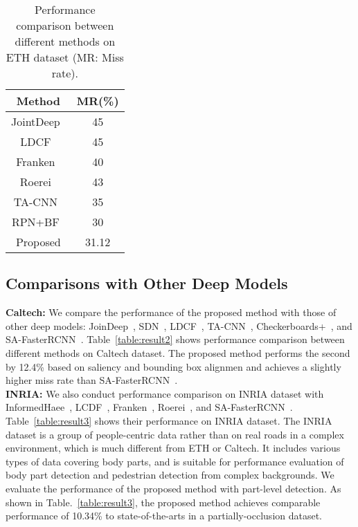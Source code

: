 \documentclass[journal]{IEEEtran}
\begin{document}
\begin{table}[t]
\caption{Performance comparison between different methods on ETH dataset (MR: Miss rate). }
\begin{center}
\begin{tabular}[c]{|c|c|}
\hline
\bf{Method} & MR(\%)  \\
\hline
JointDeep~\cite{ouyang2013joint} & 45 \\
\hline
LDCF~\cite{nam2014local} & 45 \\
\hline
Franken~\cite{mathias2013handling} & 40 \\
\hline
Roerei~\cite{benenson2013seeking} & 43 \\
\hline
TA-CNN~\cite{tian2015pedestrian} & 35 \\
\hline
RPN+BF~\cite{zhang2016faster} & 30 \\
\hline
Proposed & 31.12 \\
\hline
\end{tabular}
\end{center}
\label{table:result4}
\end{table}

\subsection{Comparisons with Other Deep Models}
\label{subsec:compare}
\textbf{Caltech:} We compare the performance of the proposed method with those of other deep models: JoinDeep~\cite{ouyang2013joint}, SDN~\cite{luo2014switchable}, LDCF~\cite{nam2014local}, TA-CNN~\cite{tian2015pedestrian}, Checkerboards+~\cite{zhang2015filtered}, and SA-FasterRCNN~\cite{li2018scale}. Table~\ref{table:result2} shows performance comparison between different methods on Caltech dataset. The proposed method performs the second by 12.4\% based on saliency and bounding box alignmen and achieves a slightly higher miss rate than SA-FasterRCNN~\cite{li2018scale}. \\

 \textbf{INRIA:} We also conduct performance comparison on INRIA dataset with InformedHaee~\cite{zhang2014informed}, LCDF~\cite{nam2014local}, Franken~\cite{mathias2013handling}, Roerei~\cite{benenson2013seeking}, and SA-FasterRCNN~\cite{li2018scale}. Table~\ref{table:result3} shows their performance on INRIA dataset. The INRIA dataset is a group of people-centric data rather than on real roads in a complex environment, which is much different from ETH or Caltech. It includes various types of data covering body parts, and is suitable for performance evaluation of body part detection and pedestrian detection from complex backgrounds. We evaluate the performance of the proposed method with part-level detection. As shown in Table.~\ref{table:result3}, the proposed method achieves comparable performance of 10.34\% to state-of-the-arts in a partially-occlusion dataset. \\
\end{document}
